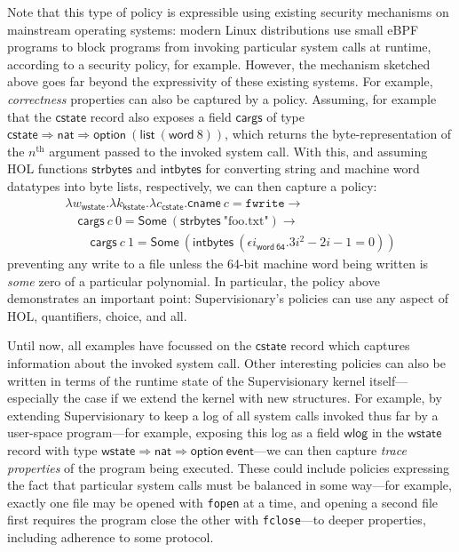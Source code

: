 \documentclass[a4paper, UKenglish, cleveref, autoref, thm-restate, colorlinks]{lipics-v2021}
\newcommand{\eps}[1]{\epsilon{#1}.}
\newcommand{\lam}[1]{\lambda{#1}.}
\begin{document}
Note that this type of policy is expressible using existing security mechanisms on mainstream operating systems: modern Linux distributions use small eBPF programs to block programs from invoking particular system calls at runtime, according to a security policy, for example.
However, the mechanism sketched above goes far beyond the expressivity of these existing systems.
For example, \emph{correctness} properties can also be captured by a policy.
Assuming, for example that the $\mathsf{cstate}$ record also exposes a field $\mathsf{cargs}$ of type $\mathsf{cstate} \Rightarrow \mathsf{nat} \Rightarrow \mathsf{option}\ (\mathsf{list}\ (\mathsf{word}\ 8))$, which returns the byte-representation of the $n^\mathrm{th}$ argument passed to the invoked system call.
With this, and assuming HOL functions $\mathsf{strbytes}$ and $\mathsf{intbytes}$ for converting string and machine word datatypes into byte lists, respectively, we can then capture a policy:
\begin{gather*}
\lam{w_{\mathsf{wstate}}}\lam{k_{\mathsf{kstate}}}\lam{c_{\mathsf{cstate}}}\mathsf{cname}\ c = \mathtt{fwrite} \longrightarrow \\
\quad\mathsf{cargs}\ c\ 0 = \mathsf{Some}\ (\mathsf{strbytes}\ \text{"foo.txt"}) \longrightarrow \\
\qquad\mathsf{cargs}\ c\ 1 = \mathsf{Some}\ (\mathsf{intbytes}\ (\eps{i_\mathsf{word\ 64}}3i^2 - 2i - 1 = 0))
\end{gather*}
preventing any write to a file unless the 64-bit machine word being written is \emph{some} zero of a particular polynomial.
In particular, the policy above demonstrates an important point: Supervisionary's policies can use any aspect of HOL, quantifiers, choice, and all.

Until now, all examples have focussed on the $\mathsf{cstate}$ record which captures information about the invoked system call.
Other interesting policies can also be written in terms of the runtime state of the Supervisionary kernel itself---especially the case if we extend the kernel with new structures.
For example, by extending Supervisionary to keep a log of all system calls invoked thus far by a user-space program---for example, exposing this log as a field $\mathsf{wlog}$ in the $\mathsf{wstate}$ record with type $\mathsf{wstate} \Rightarrow \mathsf{nat} \Rightarrow \mathsf{option}\ \mathsf{event}$---we can then capture \emph{trace properties} of the program being executed.
These could include policies expressing the fact that particular system calls must be balanced in some way---for example, exactly one file may be opened with \texttt{fopen} at a time, and opening a second file first requires the program close the other with \texttt{fclose}---to deeper properties, including adherence to some protocol.
\end{document}
